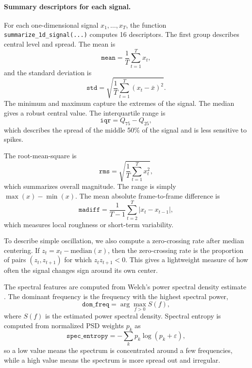 \documentclass[10pt,twocolumn]{article}
\begin{document}
\paragraph{Summary descriptors for each signal.}
For each one-dimensional signal $x_1,\dots,x_T$, the function \texttt{summarize\_1d\_signal(...)} computes 16 descriptors. The first group describes central level and spread. The mean is
\begin{equation}
\texttt{mean}=\frac{1}{T}\sum_{t=1}^{T} x_t,
\end{equation}
and the standard deviation is
\begin{equation}
\texttt{std}=\sqrt{\frac{1}{T}\sum_{t=1}^{T}(x_t-\bar{x})^2}.
\end{equation}
The minimum and maximum capture the extremes of the signal. The median gives a robust central value. The interquartile range is
\begin{equation}
\texttt{iqr}=Q_{75}-Q_{25},
\end{equation}
which describes the spread of the middle 50\% of the signal and is less sensitive to spikes.

The root-mean-square is
\begin{equation}
\texttt{rms}=\sqrt{\frac{1}{T}\sum_{t=1}^{T}x_t^2},
\end{equation}
which summarizes overall magnitude. The range is simply $\max(x)-\min(x)$. The mean absolute frame-to-frame difference is
\begin{equation}
\texttt{madiff}=\frac{1}{T-1}\sum_{t=2}^{T}|x_t-x_{t-1}|,
\end{equation}
which measures local roughness or short-term variability.

To describe simple oscillation, we also compute a zero-crossing rate after median centering. If $z_t=x_t-\mathrm{median}(x)$, then the zero-crossing rate is the proportion of pairs $(z_t,z_{t+1})$ for which $z_t z_{t+1}<0$. This gives a lightweight measure of how often the signal changes sign around its own center.

The spectral features are computed from Welch's power spectral density estimate \citep{welch1967}. The dominant frequency is the frequency with the highest spectral power,
\begin{equation}
\texttt{dom\_freq}=\arg\max_{f>0} S(f),
\end{equation}
where $S(f)$ is the estimated power spectral density. Spectral entropy is computed from normalized PSD weights $p_k$ as
\begin{equation}
\texttt{spec\_entropy}=-\sum_k p_k \log(p_k+\varepsilon),
\end{equation}
so a low value means the spectrum is concentrated around a few frequencies, while a high value means the spectrum is more spread out and irregular.
\end{document}
